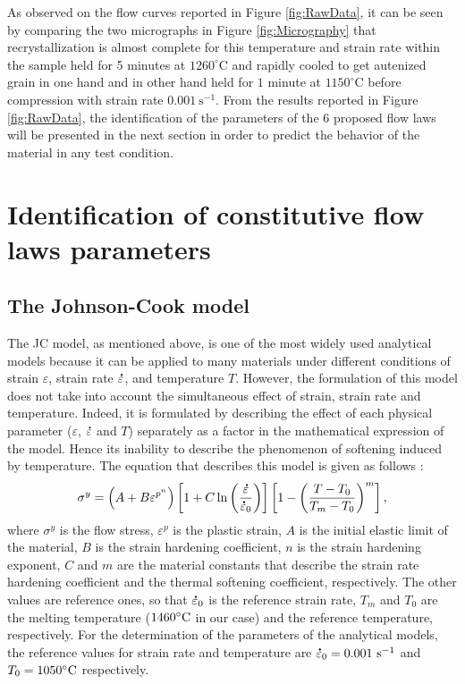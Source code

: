\documentclass[twoside,english,1p,final,sort&compress]{elsarticle}
\theoremstyle{plain}
\DeclareRobustCommand{\mdot}[1]{\accentset{\mbox{\bfseries .}}{#1}}
\DeclareRobustCommand{\ps}{\text{s}^{-1}}
\begin{document}
As observed on the flow curves reported in Figure \ref{fig:RawData}, it can be seen by comparing the two micrographs in Figure \ref{fig:Micrography} that recrystallization is almost complete for this temperature and strain rate within the sample held for 5 minutes at $1260^\circ$C and rapidly cooled to get autenized grain in one hand and in other hand held for $1$ minute at $1150^\circ$C before compression with strain rate $0.001~\text{s}^{-1}$.
From the results reported in Figure \ref{fig:RawData}, the identification of the parameters of the 6 proposed flow laws will be presented in the next section in order to predict the behavior of the material in any test condition.

\section{Identification of constitutive flow laws parameters\label{sec:ConstLaws}}
\subsection{The Johnson-Cook model\label{sec:JC}}

The JC model, as mentioned above, is one of the most widely used analytical models because it can be applied to many materials under different conditions of strain $\varepsilon$, strain rate $\mdot\varepsilon$, and temperature $T$.
However, the formulation of this model does not take into account the simultaneous effect of strain, strain rate and temperature.
Indeed, it is formulated by describing the effect of each physical parameter ($\varepsilon$, $\mdot\varepsilon$ and $T$) separately as a factor in the mathematical expression of the model.
Hence its inability to describe the phenomenon of softening induced by temperature.
The equation that describes this model is given as follows \cite{Johnson-1983}:
\begin{equation}
\sigma^y=\left(A+B\varepsilon^{p^{n}}\right) \left[1+C\ln\left(\frac{\mdot\varepsilon}{\mdot\varepsilon_0}\right)\right] \left[1-\left(\frac{T-T_0}{T_m-T_0}\right)^{m}\right],\label{eq:Johnson-Cook}
\end{equation}
where $\sigma^y$ is the flow stress, $\varepsilon^p$ is the plastic strain, $A$ is the initial elastic limit of the material, $B$ is the strain hardening coefficient, $n$ is the strain hardening exponent, $C$ and $m$ are the material constants that describe the strain rate hardening coefficient and the thermal softening coefficient, respectively.
The other values are reference ones, so that $\mdot\varepsilon_0$ is the reference strain rate, $T_m$ and $T_0$ are the melting temperature ($1460\celsius$ in our case) and the reference temperature, respectively.
For the determination of the parameters of the analytical models, the reference values for strain rate and temperature are $\mdot\varepsilon_0=0.001~\ps$ and $T_0=1050\celsius$ respectively.
\end{document}
